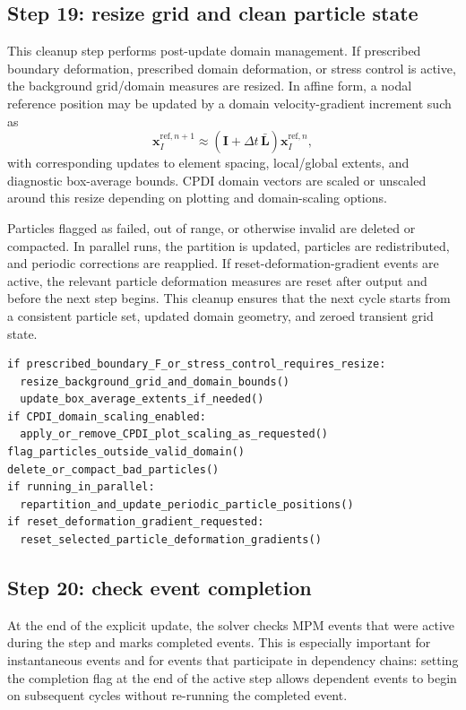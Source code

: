 \subsection{Step 19: resize grid and clean particle state}
\label{subsec:solver-step-19}
This cleanup step performs post-update domain management.  If prescribed boundary deformation, prescribed domain deformation, or stress control is active, the background grid/domain measures are resized.  In affine form, a nodal reference position may be updated by a domain velocity-gradient increment such as
\begin{equation}
  \mathbf{x}_{I}^{\mathrm{ref},n+1}\approx\left(\mathbf{I}+\Delta t\,\bar{\mathbf{L}}\right)\mathbf{x}_{I}^{\mathrm{ref},n},
\end{equation}
with corresponding updates to element spacing, local/global extents, and diagnostic box-average bounds.  CPDI domain vectors are scaled or unscaled around this resize depending on plotting and domain-scaling options.

Particles flagged as failed, out of range, or otherwise invalid are deleted or compacted.  In parallel runs, the partition is updated, particles are redistributed, and periodic corrections are reapplied.  If reset-deformation-gradient events are active, the relevant particle deformation measures are reset after output and before the next step begins.  This cleanup ensures that the next cycle starts from a consistent particle set, updated domain geometry, and zeroed transient grid state.

\begin{lstlisting}[caption={Grid resize and cleanup.},basicstyle=\ttfamily\small]
if prescribed_boundary_F_or_stress_control_requires_resize:
  resize_background_grid_and_domain_bounds()
  update_box_average_extents_if_needed()
if CPDI_domain_scaling_enabled:
  apply_or_remove_CPDI_plot_scaling_as_requested()
flag_particles_outside_valid_domain()
delete_or_compact_bad_particles()
if running_in_parallel:
  repartition_and_update_periodic_particle_positions()
if reset_deformation_gradient_requested:
  reset_selected_particle_deformation_gradients()
\end{lstlisting}

\subsection{Step 20: check event completion}
\label{subsec:solver-step-20}
At the end of the explicit update, the solver checks MPM events that were active during the step and marks completed events.  This is especially important for instantaneous events and for events that participate in dependency chains: setting the completion flag at the end of the active step allows dependent events to begin on subsequent cycles without re-running the completed event.

